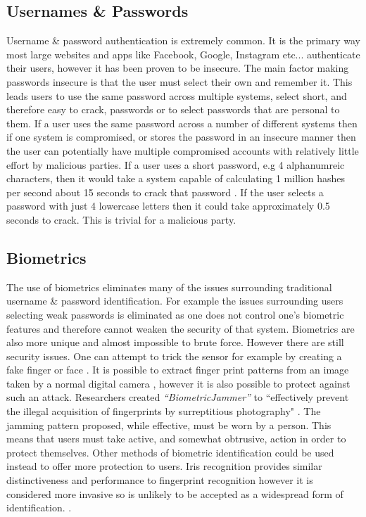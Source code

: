 \documentclass[12pt]{article}
\begin{document}
	\subsection{Usernames \& Passwords}
	Username \& password authentication is extremely common. It is the primary way most large websites and apps like Facebook, Google, Instagram etc... authenticate their users, however it has been proven to be insecure. The main factor making passwords insecure is that the user must select their own and remember it. This leads users to use the same password across multiple systems, select short, and therefore easy to crack, passwords or to select passwords that are personal to them.
	If a user uses the same password across a number of different systems then if one system is compromised, or stores the password in an insecure manner then the user can potentially have multiple compromised accounts with relatively little effort by malicious parties.
	If a user uses a short password, e.g 4 alphanumreic characters, then it would take a system capable of calculating 1 million hashes per second about 15 seconds to crack that password \citep{kessler1996passwords}. If the user selects a password with just 4 lowercase letters then it could take approximately 0.5 seconds to crack. This is trivial for a malicious party.
	\subsection{Biometrics}
	\label{subsect_biometrics}
	The use of biometrics eliminates many of the issues surrounding traditional username \& password identification. For example the issues surrounding users selecting weak passwords is eliminated as one does not control one's biometric features and therefore cannot weaken the security of that system. Biometrics are also more unique and almost impossible to brute force.
	However there are still security issues. One can attempt to trick the sensor for example by creating a fake finger or face \citep{ambalakat2005security}. It is possible to extract finger print patterns from an image taken by a normal digital camera \citep{ogane2017biometric}, however it is also possible to protect against such an attack. Researchers created \emph{``BiometricJammer''} to ``effectively prevent the illegal acquisition of fingerprints by surreptitious photography" \citep{ogane2017biometric}. The jamming pattern proposed, while effective, must be worn by a person. This means that users must take active, and somewhat obtrusive, action in order to protect themselves. Other methods of biometric identification could be used instead to offer more protection to users.
	Iris recognition provides similar distinctiveness and performance to fingerprint recognition however it is considered more invasive so is unlikely to be accepted as a widespread form of identification. \citep{ambalakat2005security}.
\end{document}
